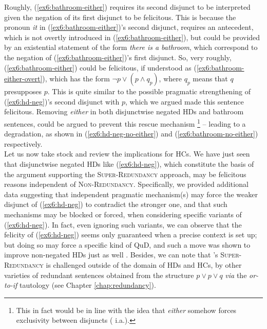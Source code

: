 \begin{exe}
	\ex \label{ex6:bathroom}
	\begin{xlist}
		\label{ex6:bathroom-either}
		\label{ex6:bathroom-no-either}
		\label{ex6:bathroom-either-overt}
	\end{xlist}
\end{exe}
Roughly, (\ref{ex6:bathroom-either}) requires its second disjunct to be interpreted given the negation of its first disjunct to be felicitous. This is because the pronoun \textit{it} in (\ref{ex6:bathroom-either})'s second disjunct, requires an antecedent, which is not overtly introduced in (\ref{ex6:bathroom-either}), but could be provided by an existential statement of the form \textit{there is a bathroom}, which correspond to the negation of (\ref{ex6:bathroom-either})'s first disjunct. So, very roughly, (\ref{ex6:bathroom-either}) could be felicitous, if understood as (\ref{ex6:bathroom-either-overt}), which has the form $\neg p \vee (p \wedge q_p)$, where $q_p$ means that $q$ presupposes $p$. This is quite similar to the possible pragmatic strengthening of (\ref{ex6:hd-neg})'s second disjunct with $p$, which we argued made this sentence felicitous. Removing \textit{either} in both disjunctwise negated HDs and bathroom sentences, could be argued to prevent this rescue mechanism \footnote{This in fact would be in line with the idea that \textit{either} somehow forces exclusivity between disjuncts ( i.a.).} -- leading to a degradation, as shown in (\ref{ex6:hd-neg-no-either}) and (\ref{ex6:bathroom-no-either}) respectively.\\


Let us now take stock and review the implications for HCs. We have just seen that disjunctwise negated HDs like (\ref{ex6:hd-neg}), which constitute the basis of the argument supporting the \textsc{Super-Redundancy} approach, may be felicitous reasons independent of \textsc{Non-Redundancy}. Specifically, we provided additional data suggesting that independent pragmatic mechanism(s) may force the weaker disjunct of (\ref{ex6:hd-neg}) to contradict the stronger one, and that such mechanisms may be blocked or forced, when considering specific variants of (\ref{ex6:hd-neg}). In fact, even ignoring such variants, we can observe that the felicity of (\ref{ex6:hd-neg}) seems only guaranteed when a precise context is set up; but doing so may force a specific kind of QuD, and such a move was shown to improve non-negated HDs just as well \citep{Haslinger2023}. Besides, we can note that \cite{Kalomoiros2024}'s \textsc{Super-Redundancy} is challenged outside of the domain of HDs and HCs, by other varieties of redundant sentences obtained from the structure $p\vee p \vee q$ \textit{via} the \textit{or-to-if} tautology (see Chapter \ref{chap:redundancy}).\\

